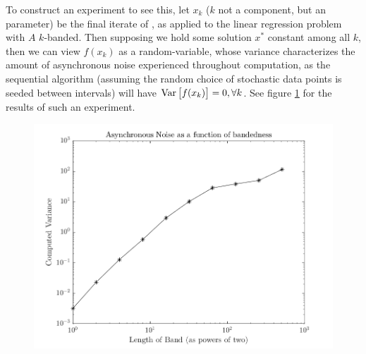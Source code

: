 To construct an experiment to see this, let $x_k$ ($k$ not a component, but an
parameter) be the final iterate of \hogwild, as applied to the linear regression
problem with $A$ $k$-banded. Then supposing we hold some solution $x^*$ constant
among all $k$, then we can view $f(x_k)$ as a random-variable, whose variance
characterizes the amount of asynchronous noise experienced throughout
computation, as the sequential algorithm (assuming the random choice of
stochastic data points is seeded between intervals) will have ${\rm Var}\left[f(x_k)\right] = 0,
\forall k$. See figure \ref{fig:variances} for the results of such an
experiment.
\begin{figure}[!htb]
  \centering
  \includegraphics[width=.8\textwidth]{./resources/banded_asyncnoise}
  \caption{
  } \label{fig:variances}
\end{figure}
